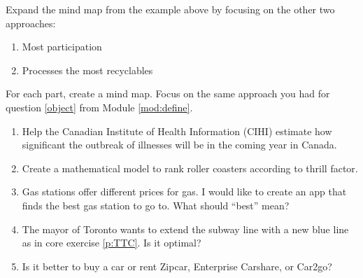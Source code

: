 \begin{exercises}
	\begin{problist}
		\prob
		Expand the mind map from the example above by focusing on the other two approaches:
		\begin{enumerate}
			\item Most participation
			\item Processes the most recyclables
		\end{enumerate}

		\prob
	For each part, create a mind map. Focus on the same approach you had for question \ref{object} from Module \ref{mod:define}.
		\begin{enumerate}
			\item Help the Canadian Institute of Health Information (CIHI) estimate how significant the outbreak of illnesses will be in the coming year in Canada.
			\item Create a mathematical model to rank roller coasters according to thrill factor.
			\item Gas stations offer different prices for gas. I would like to create an app that finds the best gas station to go to. What should ``best'' mean?
			\item The mayor of Toronto wants to extend the subway line with a new blue line as in core exercise \ref{p:TTC}. Is it optimal?
			
			\item Is it better to buy a car or rent Zipcar, Enterprise Carshare, or Car2go?
		
	\end{enumerate}
	\end{problist}
\end{exercises}
